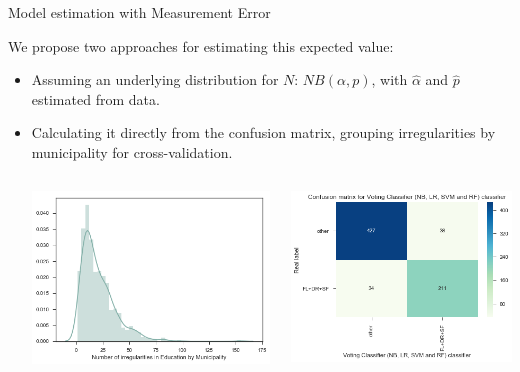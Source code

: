 \documentclass[handout,t,usenames,dvipsnames]{beamer}
\begin{document}
\begin{frame}{Model estimation with Measurement Error}
\justifying

We propose two approaches for estimating this expected value: 
\begin{itemize}
\justifying
\small
    \item Assuming an underlying distribution for $N$: $NB(\alpha,p)$, with $\hat{\alpha}$ and $\hat{p}$ estimated from data.
    \item Calculating it directly from the confusion matrix, grouping irregularities by municipality for cross-validation.

\begin{columns}
\begin{column}{0.5\textwidth}
    \begin{center}
     \includegraphics[width=1\textwidth]{n_irreg_EDUC.png}
     \end{center}
\end{column}
\begin{column}{0.5\textwidth}  %
    \begin{center}
     \includegraphics[width=1\textwidth]{matrix_mun.png}

\end{center}
\end{column}
\end{columns}
\end{itemize}
\end{frame}
\end{document}
